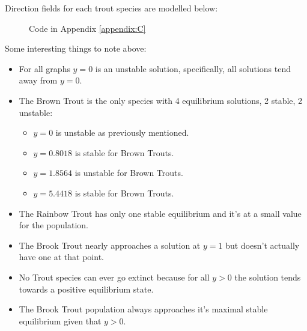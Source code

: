 \documentclass[letterpaper,12pt]{article}
\begin{document}
Direction fields for each trout species are modelled below:
\begin{figure}[H]
    \begin{adjustwidth}{-1in}{-1in}
    \centering
    \begin{subfigure}[b]{0.65\textwidth}
        \centering
        
        \label{fig:4a}
    \end{subfigure}
    \hfill
    \begin{subfigure}[b]{0.65\textwidth}
        \centering
        
        \label{fig:4b}
    \end{subfigure}
    \hfill
    \begin{subfigure}[b]{0.65\textwidth}
        \centering
        
        \label{fig:4c}
    \end{subfigure}
    \caption{Code in Appendix \ref{appendix:C}}
    \label{fig:4}
    \end{adjustwidth}
\end{figure}
Some interesting things to note above:
\begin{itemize}
    \item For all graphs \(y = 0\) is an unstable solution, specifically, all solutions tend away from \(y = 0\).
    \item The Brown Trout is the only species with 4 equilibrium solutions, 2 stable, 2 unstable:
        \begin{itemize}
            \item \(y = 0\) is unstable as previously mentioned.
            \item \(y = 0.8018\) is stable for Brown Trouts.
            \item \(y = 1.8564\) is unstable for Brown Trouts.
            \item \(y = 5.4418\) is stable for Brown Trouts.
        \end{itemize}
    \item The Rainbow Trout has only one stable equilibrium and it's at a small value for the population.
    \item The Brook Trout nearly approaches a solution at \(y = 1\) but doesn't actually have one at that point.
    \item No Trout species can ever go extinct because for all \(y > 0\) the solution tends towards a positive equilibrium state.
    \item The Brook Trout population always approaches it's maximal stable equilibrium given that \(y > 0\).
\end{itemize}
\end{document}
